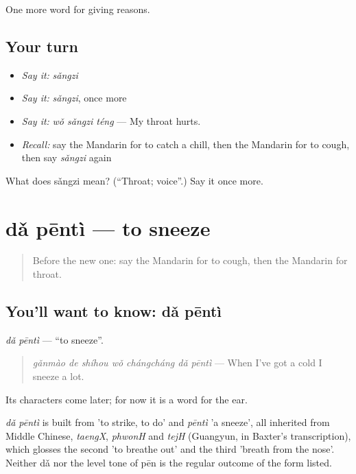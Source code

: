\begin{grammarlens}[title={What you've built}]
One more word for giving reasons.
\end{grammarlens}

\subsection*{Your turn}
\begin{itemize}
\raggedright
  \item \emph{Say it:} \emph{sǎngzi}
  \item \emph{Say it:} \emph{sǎngzi}, once more
  \item \emph{Say it:} \emph{wǒ sǎngzi téng} — My throat hurts.
  \item \emph{Recall:} say the Mandarin for to catch a chill, then the Mandarin for to cough, then say \emph{sǎngzi} again
\end{itemize}

\begin{tcolorbox}[breakable,colback=teal!4,colframe=teal!35!black,title={Before you move on}]
What does sǎngzi mean? (\textquotedblleft{}Throat; voice\textquotedblright{}.) Say it once more.
\end{tcolorbox}
\section[dǎ pēntì]{dǎ pēntì — to sneeze}

\label{lesson:ZH-C222-dapenti}



\begin{quote}
Before the new one: say the Mandarin for to cough, then the Mandarin for throat.
\end{quote}

\subsection*{You'll want to know: dǎ pēntì}
\emph{dǎ pēntì} — \textquotedblleft{}to sneeze\textquotedblright{}.

\begin{quote}
\emph{gǎnmào de shíhou wǒ chángcháng dǎ pēntì} — When I've got a cold I sneeze a lot.
\end{quote}

Its characters come later; for now it is a word for the ear.

\begin{cousinweb}
\emph{dǎ pēntì} is built from  'to strike, to do' and \emph{pēntì} 'a sneeze', all inherited from Middle Chinese, \emph{taengX}, \emph{phwonH} and \emph{tejH} (Guangyun, in Baxter's transcription), which glosses the second 'to breathe out' and the third 'breath from the nose'. Neither dǎ nor the level tone of pēn is the regular outcome of the form listed.
\end{cousinweb}

